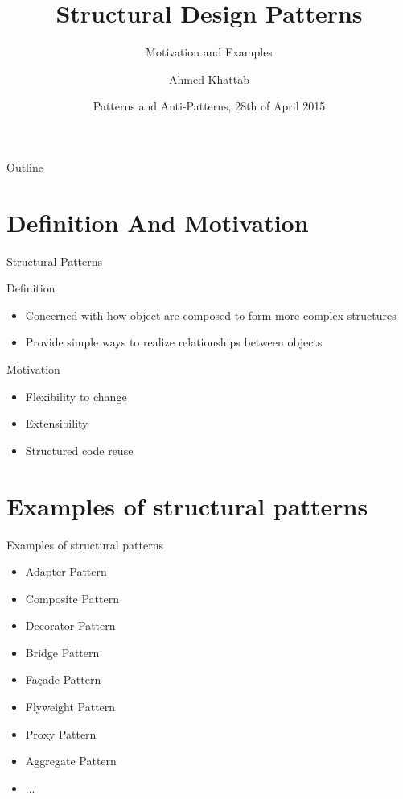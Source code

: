 \documentclass{beamer}
\title{Structural Design Patterns}
\subtitle{Motivation and Examples}
\author{Ahmed Khattab}
\institute[TUM]{Technische Universit{\"a}t M{\"u}nchen}
\date[28.04.2015]{Patterns and Anti-Patterns, 28th of April 2015}
\begin{document}
\begin{frame}
  \titlepage
\end{frame}

\begin{frame}{Outline}
  \tableofcontents
\end{frame}

\section{Definition And Motivation}

\begin{frame}{Structural Patterns}%
 \begin{block}{Definition}
 \begin{itemize}
   \item {Concerned with how object are composed to form more complex structures}
   \item {Provide simple ways to realize relationships between objects}
 \end{itemize}
 \end{block}
 
 \begin{block}{Motivation}
 \begin{itemize}
   \item {Flexibility to change}
   \item {Extensibility}
   \item {Structured code reuse}
 \end{itemize}
 \end{block}
\end{frame}

\section{Examples of structural patterns}

\begin{frame}{Examples of structural patterns}
  \begin{itemize}
   \item {
    Adapter Pattern
  }
  \item {   
    Composite Pattern
  }
  \item {
    Decorator Pattern
  }
  \item {
    Bridge Pattern
  }
  \item {
    Fa\c{c}ade Pattern
  }
  \item {
    Flyweight Pattern
  }
  \item {
    Proxy Pattern
  }
  \item {
    Aggregate Pattern
  }
   \item {
    ...
  }
  \end{itemize}
\end{frame}
\end{document}
